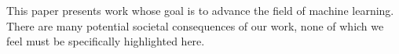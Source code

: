 \documentclass{article}
\theoremstyle{plain}
\theoremstyle{definition}
\theoremstyle{remark}
\begin{document}
This paper presents work whose goal is to advance the field of machine learning. There are many potential societal consequences of our work, none of which we feel must be specifically highlighted here.




\newpage
\appendix
\onecolumn

\end{document}
